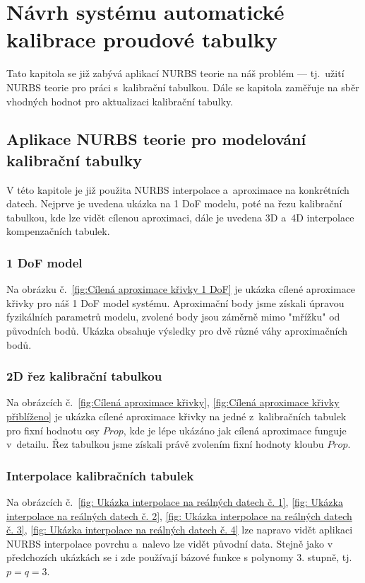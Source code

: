 \section{Návrh systému automatické kalibrace proudové tabulky}\label{section: návrh automatické kalibraci}
Tato kapitola se již zabývá aplikací NURBS teorie na náš problém --- tj.~užití NURBS teorie pro práci s~kalibrační tabulkou. Dále se kapitola zaměřuje na sběr vhodných hodnot pro aktualizaci kalibrační tabulky.
\subsection{Aplikace NURBS teorie pro modelování kalibrační tabulky}
V této kapitole je již použita NURBS interpolace a~aproximace na konkrétních datech. Nejprve je uvedena ukázka na 1 DoF modelu, poté na řezu kalibrační tabulkou, kde lze vidět cílenou aproximaci, dále je uvedena 3D a~4D interpolace kompenzačních tabulek.
\subsubsection{1 DoF model}
Na obrázku č.~\ref{fig:Cílená aproximace křivky 1 DoF} je ukázka cílené aproximace křivky pro náš 1 DoF model systému. Aproximační body jsme získali úpravou fyzikálních parametrů modelu, zvolené body jsou záměrně mimo "mřížku" od původních bodů. Ukázka obsahuje výsledky pro dvě různé váhy aproximačních bodů.
\subsubsection{2D řez kalibrační tabulkou}
Na obrázcích č.~\ref{fig:Cílená aproximace křivky}, \ref{fig:Cílená aproximace křivky přiblíženo} je ukázka
cílené aproximace křivky na jedné z~kalibračních tabulek pro fixní hodnotu osy $Prop$, kde je lépe ukázáno jak cílená aproximace funguje v~detailu. Řez tabulkou jsme získali právě zvolením fixní hodnoty kloubu $Prop$.
\subsubsection{Interpolace kalibračních tabulek}
Na obrázcích č.~\ref{fig: Ukázka interpolace na reálných datech č. 1}, \ref{fig: Ukázka interpolace na reálných datech č. 2}, \ref{fig: Ukázka interpolace na reálných datech č. 3}, \ref{fig: Ukázka interpolace na reálných datech č. 4} lze napravo vidět aplikaci NURBS interpolace povrchu a~nalevo lze vidět původní data.
Stejně jako v předchozích ukázkách se i zde používají bázové funkce s polynomy 3. stupně, tj. $p = q = 3$.
